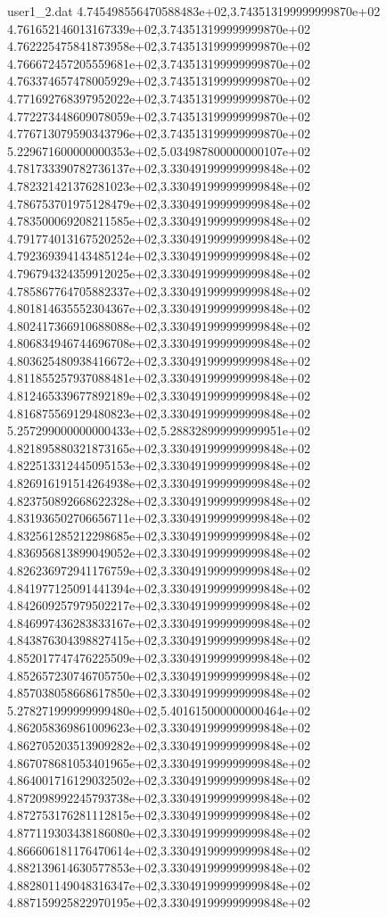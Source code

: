 \begin{filecontents}{user1_2.dat}
4.745498556470588483e+02,3.743513199999999870e+02
4.761652146013167339e+02,3.743513199999999870e+02
4.762225475841873958e+02,3.743513199999999870e+02
4.766672457205559681e+02,3.743513199999999870e+02
4.763374657478005929e+02,3.743513199999999870e+02
4.771692768397952022e+02,3.743513199999999870e+02
4.772273448609078059e+02,3.743513199999999870e+02
4.776713079590343796e+02,3.743513199999999870e+02
5.229671600000000353e+02,5.034987800000000107e+02
4.781733390782736137e+02,3.330491999999999848e+02
4.782321421376281023e+02,3.330491999999999848e+02
4.786753701975128479e+02,3.330491999999999848e+02
4.783500069208211585e+02,3.330491999999999848e+02
4.791774013167520252e+02,3.330491999999999848e+02
4.792369394143485124e+02,3.330491999999999848e+02
4.796794324359912025e+02,3.330491999999999848e+02
4.785867764705882337e+02,3.330491999999999848e+02
4.801814635552304367e+02,3.330491999999999848e+02
4.802417366910688088e+02,3.330491999999999848e+02
4.806834946744696708e+02,3.330491999999999848e+02
4.803625480938416672e+02,3.330491999999999848e+02
4.811855257937088481e+02,3.330491999999999848e+02
4.812465339677892189e+02,3.330491999999999848e+02
4.816875569129480823e+02,3.330491999999999848e+02
5.257299000000000433e+02,5.288328999999999951e+02
4.821895880321873165e+02,3.330491999999999848e+02
4.822513312445095153e+02,3.330491999999999848e+02
4.826916191514264938e+02,3.330491999999999848e+02
4.823750892668622328e+02,3.330491999999999848e+02
4.831936502706656711e+02,3.330491999999999848e+02
4.832561285212298685e+02,3.330491999999999848e+02
4.836956813899049052e+02,3.330491999999999848e+02
4.826236972941176759e+02,3.330491999999999848e+02
4.841977125091441394e+02,3.330491999999999848e+02
4.842609257979502217e+02,3.330491999999999848e+02
4.846997436283833167e+02,3.330491999999999848e+02
4.843876304398827415e+02,3.330491999999999848e+02
4.852017747476225509e+02,3.330491999999999848e+02
4.852657230746705750e+02,3.330491999999999848e+02
4.857038058668617850e+02,3.330491999999999848e+02
5.278271999999999480e+02,5.401615000000000464e+02
4.862058369861009623e+02,3.330491999999999848e+02
4.862705203513909282e+02,3.330491999999999848e+02
4.867078681053401965e+02,3.330491999999999848e+02
4.864001716129032502e+02,3.330491999999999848e+02
4.872098992245793738e+02,3.330491999999999848e+02
4.872753176281112815e+02,3.330491999999999848e+02
4.877119303438186080e+02,3.330491999999999848e+02
4.866606181176470614e+02,3.330491999999999848e+02
4.882139614630577853e+02,3.330491999999999848e+02
4.882801149048316347e+02,3.330491999999999848e+02
4.887159925822970195e+02,3.330491999999999848e+02

\end{filecontents}
